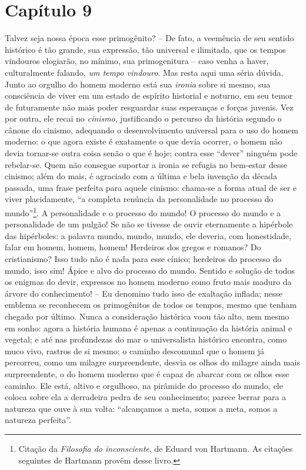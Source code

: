 \chapter{Capítulo 9}\label{capuxedtulo-9}

Talvez seja nossa época esse primogênito? -- De fato, a veemência de
seu sentido histórico é tão grande, sua expressão, tão universal e
ilimitada, que os tempos vindouros elogiarão, no mínimo, sua
primogenitura -- caso venha a haver, culturalmente falando, \emph{um
tempo vindouro}. Mas resta aqui uma séria dúvida. Junto ao orgulho
do homem moderno está sua \emph{ironia} sobre si mesmo, sua
consciência de viver em um estado de espírito historial e noturno,
em seu temor de futuramente não mais poder resguardar suas
esperanças e forças juvenis. Vez por outra, ele recai no
\emph{cinismo}, justificando o percurso da história segundo o cânone
do cinismo, adequando o desenvolvimento universal para o uso do
homem moderno: o que agora existe é exatamente o que devia ocorrer,
o homem não devia tornar-se outra coisa senão o que é hoje; contra
esse ``dever'' ninguém pode rebelar-se. Quem não consegue suportar a
ironia se refugia no bem-estar desse cinismo; além do mais, é
agraciado com a última e bela invenção da década passada, uma frase
perfeita para aquele cinismo: chama-se a forma atual de ser e viver
placidamente, ``a completa renúncia da personalidade no processo do
mundo''\footnote{Citação da \emph{Filosofia do inconsciente}, de
Eduard von Hartmann. As citações seguintes de Hartmann provêm
desse livro.}. A personalidade e o processo do mundo! O processo
do mundo e a personalidade de um pulgão! Se não se tivesse de ouvir
eternamente a hipérbole das hipérboles: a palavra mundo, mundo,
mundo, ele deveria, com honestidade, falar em homem, homem, homem!
Herdeiros dos gregos e romanos? Do cristianismo? Isso tudo não é
nada para esse cínico; herdeiros do processo do mundo, isso sim!
Ápice e alvo do processo do mundo. Sentido e solução de todos os
enigmas do devir, expressos no homem moderno como fruto mais maduro
    da árvore do conhecimento! -- Eu denomino tudo isso de exaltação
    inflada; nesse emblema se reconhecem os primogênitos de todos os
    tempos, mesmo que tenham chegado por último. Nunca a consideração
    histórica voou tão alto, nem mesmo em sonho: agora a história humana
    é apenas a continuação da história animal e vegetal; e até nas
    profundezas do mar o universalista histórico encontra, como muco
    vivo, rastros de si mesmo; o caminho descomunal que o homem já
    percorreu, como um milagre surpreendente, desvia os olhos do milagre
    ainda mais surpreendente, o do homem moderno que é capaz de abarcar
    com os olhos esse caminho. Ele está, altivo e orgulhoso, na pirâmide
    do processo do mundo, ele coloca sobre ela a derradeira pedra de seu
    conhecimento; parece berrar para a natureza que ouve à sua volta:
    ``alcançamos a meta, somos a meta, somos a natureza perfeita''.


